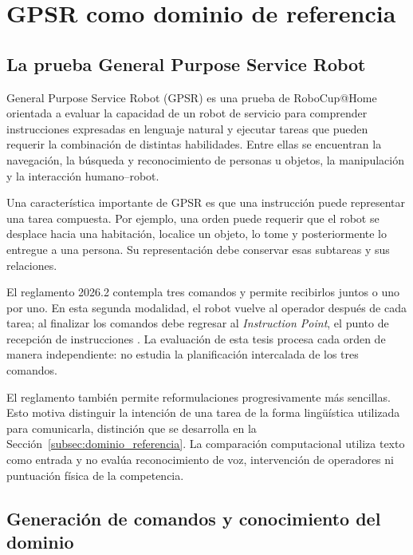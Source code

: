 \section{GPSR como dominio de referencia}
\label{sec:gpsr_referencia}

\subsection{La prueba General Purpose Service Robot}
\label{subsec:gpsr}

General Purpose Service Robot (GPSR) es una prueba de RoboCup@Home orientada a
evaluar la capacidad de un robot de servicio para comprender instrucciones
expresadas en lenguaje natural y ejecutar tareas que pueden requerir la
combinación de distintas habilidades. Entre ellas se encuentran la navegación,
la búsqueda y reconocimiento de personas u objetos, la manipulación y la
interacción humano--robot\cite{robocuphome2026rulebook}.

Una característica importante de GPSR es que una instrucción puede representar
una tarea compuesta. Por ejemplo, una orden puede requerir que el robot se
desplace hacia una habitación, localice un objeto, lo tome y posteriormente lo
entregue a una persona. Su representación debe conservar esas subtareas y sus relaciones.

El reglamento 2026.2 contempla tres comandos y permite recibirlos juntos o uno por uno. En esta segunda modalidad, el robot vuelve al operador después de cada tarea; al finalizar los comandos debe regresar al \textit{Instruction Point}, el punto de recepción de instrucciones \cite{robocuphome2026rulebook}. La evaluación de esta tesis procesa cada orden de manera independiente: no estudia la planificación intercalada de los tres comandos.

El reglamento también permite reformulaciones progresivamente más sencillas. Esto motiva distinguir la intención de una tarea de la forma lingüística utilizada para comunicarla, distinción que se desarrolla en la Sección~\ref{subsec:dominio_referencia}. La comparación computacional utiliza texto como entrada y no evalúa reconocimiento de voz, intervención de operadores ni puntuación física de la competencia.

\subsection{Generación de comandos y conocimiento del dominio}
\label{subsec:gpsr_generador}

